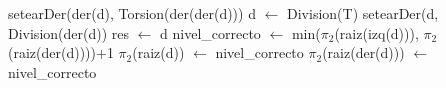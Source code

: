 \begin{algorithm}
\begin{algorithmic}[0]
	 
		\State setearDer(der(d), Torsion(der(der(d))) 
	\EndIf
	\State d $\gets$ Division(T) 
	\State setearDer(d, Division(der(d)) 
	\State res $\gets$ d 
\EndFunction
{}
	\State nivel\_correcto $\gets$ min($\pi_2$(raiz(izq(d))), $\pi_2$(raiz(der(d))))+1 
	 
		\State $\pi_2$(raiz(d)) $\gets$ nivel\_correcto 
		 
			\State $\pi_2$(raiz(der(d))) $\gets$ nivel\_correcto 
		\EndIf
	\EndIf
\EndProcedure
\end{algorithmic}
\end{algorithm}


